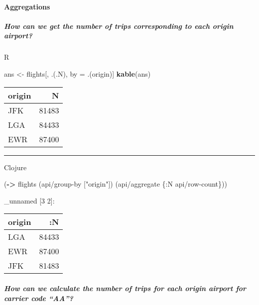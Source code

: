 \documentclass[]{article}
\newenvironment{Shaded}{\begin{snugshade}}{\end{snugshade}}
\newcommand{\KeywordTok}[1]{\textcolor[rgb]{0.13,0.29,0.53}{\textbf{#1}}}
\newcommand{\StringTok}[1]{\textcolor[rgb]{0.31,0.60,0.02}{#1}}
\newcommand{\AttributeTok}[1]{\textcolor[rgb]{0.77,0.63,0.00}{#1}}
\newcommand{\NormalTok}[1]{#1}
\let\oldparagraph\paragraph
\renewcommand{\paragraph}[1]{\oldparagraph{#1}\mbox{}}
\let\oldsubparagraph\subparagraph
\renewcommand{\subparagraph}[1]{\oldsubparagraph{#1}\mbox{}}
\begin{document}
\paragraph{Aggregations}\label{aggregations}

\subparagraph{How can we get the number of trips corresponding to each
origin
airport?}\label{how-can-we-get-the-number-of-trips-corresponding-to-each-origin-airport}

R

\begin{Shaded}
\begin{Highlighting}[]
\NormalTok{ans <-}\StringTok{ }\NormalTok{flights[, .(.N), by =}\StringTok{ }\NormalTok{.(origin)]}
\KeywordTok{kable}\NormalTok{(ans)}
\end{Highlighting}
\end{Shaded}

\begin{longtable}[]{@{}lr@{}}
\toprule
origin & N\tabularnewline
\midrule
\endhead
JFK & 81483\tabularnewline
LGA & 84433\tabularnewline
EWR & 87400\tabularnewline
\bottomrule
\end{longtable}

\begin{center}\rule{0.5\linewidth}{0.5pt}\end{center}

Clojure

\begin{Shaded}
\begin{Highlighting}[]
\NormalTok{(}\KeywordTok{->}\NormalTok{ flights}
\NormalTok{    (api/group-by [}\StringTok{"origin"}\NormalTok{])}
\NormalTok{    (api/aggregate \{}\AttributeTok{:N}\NormalTok{ api/row-count\}))}
\end{Highlighting}
\end{Shaded}

\_unnamed {[}3 2{]}:

\begin{longtable}[]{@{}lr@{}}
\toprule
origin & :N\tabularnewline
\midrule
\endhead
LGA & 84433\tabularnewline
EWR & 87400\tabularnewline
JFK & 81483\tabularnewline
\bottomrule
\end{longtable}

\subparagraph{\texorpdfstring{How can we calculate the number of trips
for each origin airport for carrier code
``AA''?}{How can we calculate the number of trips for each origin airport for carrier code AA?}}\label{how-can-we-calculate-the-number-of-trips-for-each-origin-airport-for-carrier-code-aa}
\end{document}

